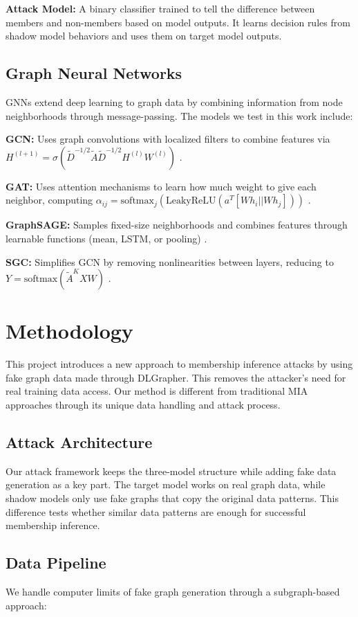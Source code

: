 \documentclass{article}
\begin{document}
\textbf{Attack Model:} A binary classifier trained to tell the difference between members and non-members based on model outputs. It learns decision rules from shadow model behaviors and uses them on target model outputs.

\subsection{Graph Neural Networks}
GNNs extend deep learning to graph data by combining information from node neighborhoods through message-passing. The models we test in this work include:

\textbf{GCN:} Uses graph convolutions with localized filters to combine features via $H^{(l+1)} = \sigma(\tilde{D}^{-1/2}\tilde{A}\tilde{D}^{-1/2}H^{(l)}W^{(l)})$ \cite{kipf2017semi}.

\textbf{GAT:} Uses attention mechanisms to learn how much weight to give each neighbor, computing $\alpha_{ij} = \text{softmax}_j(\text{LeakyReLU}(a^T[Wh_i||Wh_j]))$ \cite{velickovic2018graph}.

\textbf{GraphSAGE:} Samples fixed-size neighborhoods and combines features through learnable functions (mean, LSTM, or pooling) \cite{hamilton2017inductive}.

\textbf{SGC:} Simplifies GCN by removing nonlinearities between layers, reducing to $Y = \text{softmax}(\tilde{A}^KXW)$ \cite{wu2019simplifying}.

\section{Methodology}
This project introduces a new approach to membership inference attacks by using fake graph data made through DLGrapher. This removes the attacker's need for real training data access. Our method is different from traditional MIA approaches through its unique data handling and attack process.

\subsection{Attack Architecture}
Our attack framework keeps the three-model structure while adding fake data generation as a key part. The target model works on real graph data, while shadow models only use fake graphs that copy the original data patterns. This difference tests whether similar data patterns are enough for successful membership inference.

\subsection{Data Pipeline}
We handle computer limits of fake graph generation through a subgraph-based approach:
\end{document}
